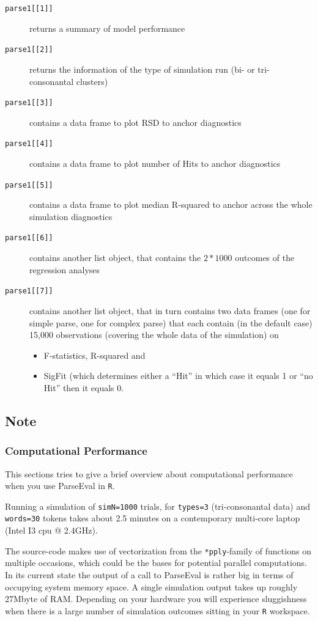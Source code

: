 \documentclass[
draft=false,
toc=graduated,
listof=totoc,
headsepline=true,
]%
{scrartcl}
\begin{document}
\begin{description}
\item[\texttt{parse1[[1]]}] returns a summary of model performance
\item[\texttt{parse1[[2]]}] returns the information of the type of simulation run (bi- or tri-con\-so\-nan\-tal clusters)
\item[\texttt{parse1[[3]]}] contains a data frame to plot RSD to anchor diagnostics
\item[\texttt{parse1[[4]]}] contains a data frame to plot number of Hits to anchor diagnostics
\item[\texttt{parse1[[5]]}] contains a data frame to plot median R-squared to anchor across the whole simulation diagnostics
\item[\texttt{parse1[[6]]}] contains another list object, that contains the $2*1000$ outcomes of the regression analyses
\item[\texttt{parse1[[7]]}] contains another list object, that in turn contains two data frames (one for simple parse, one for complex parse) that each contain (in the default case) 15,000 observations (covering the whole data of the simulation) on
\begin{itemize}
\item F-statistics, R-squared and
\item SigFit (which determines either a \enquote{Hit} in which case it equals 1 or \enquote{no Hit} then it equals 0.
\end{itemize}
\end{description}
\subsection{Note}
\label{subsec:note}
\subsubsection{Computational Performance}
This sections tries to give a brief overview about computational performance when you use ParseEval in \texttt{R}.\par
Running a simulation of \texttt{simN=1000} trials, for \texttt{types=3} (tri-consonantal data) and \texttt{words=30} tokens takes about 2.5 minutes on a contemporary multi-core laptop (Intel I3 cpu @ 2.4GHz).\par
The source-code makes use of vectorization from the \texttt{*pply}-family of functions on multiple occasions, which could be the bases for potential parallel computations.\\[1em]
In its current state the output of a call to ParseEval is rather big in terms of occupying system memory space. A single simulation output takes up roughly 27Mbyte of RAM. Depending on your hardware you will experience sluggishness when there is a large number of simulation outcomes sitting in your \texttt{R} workspace.
\end{document}
